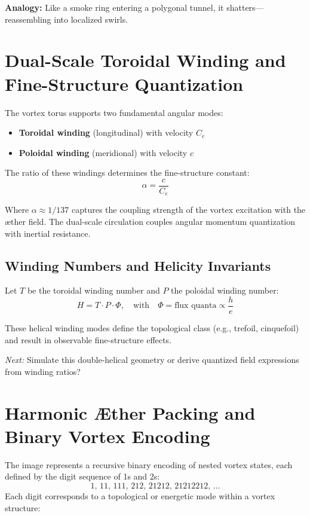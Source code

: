 \documentclass[11pt]{article}
\begin{document}
\textbf{Analogy:} Like a smoke ring entering a polygonal tunnel, it shatters---reassembling into localized swirls.

\section*{Dual-Scale Toroidal Winding and Fine-Structure Quantization}

The vortex torus supports two fundamental angular modes:

\begin{itemize}
  \item \textbf{Toroidal winding} (longitudinal) with velocity $C_e$
  \item \textbf{Poloidal winding} (meridional) with velocity $c$
\end{itemize}

The ratio of these windings determines the fine-structure constant:
\begin{equation}
    \alpha = \frac{c}{C_e}
\end{equation}

Where $\alpha \approx 1/137$ captures the coupling strength of the vortex excitation with the æther field. The dual-scale circulation couples angular momentum quantization with inertial resistance.

\subsection*{Winding Numbers and Helicity Invariants}

Let $T$ be the toroidal winding number and $P$ the poloidal winding number:
\begin{equation}
    H = T \cdot P \cdot \Phi, \quad \text{with} \quad \Phi = \text{flux quanta} \propto \frac{h}{e}
\end{equation}

These helical winding modes define the topological class (e.g., trefoil, cinquefoil) and result in observable fine-structure effects.

\textit{Next:} Simulate this double-helical geometry or derive quantized field expressions from winding ratios?

\section*{Harmonic Æther Packing and Binary Vortex Encoding}

The image represents a recursive binary encoding of nested vortex states, each defined by the digit sequence of 1s and 2s:
\[
1,\, 11,\, 111,\, 212,\, 21212,\, 21212212,\, \dots
\]
Each digit corresponds to a topological or energetic mode within a vortex structure:
\end{document}
